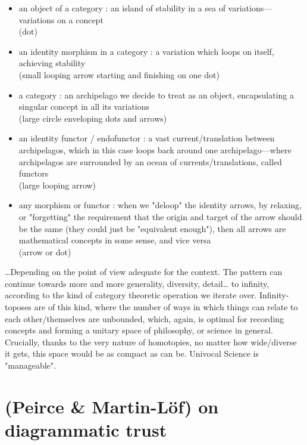\documentclass[11pt]{article}
\begin{document}
\begin{itemize}

\item an object of a category : an island of stability in a sea of variations---variations on
a concept\\ (dot)

\item an identity morphism in a category : a variation which loops on itself, achieving
stability\\ (small looping arrow starting and
finishing on one dot)

\item a category : an archipelago we decide to treat as an object, encapsulating a singular
concept in all its variations\\ (large circle
enveloping dots and arrows)

\item an identity functor / endofunctor : a vast current/translation between archipelagos,
which in this case loops back around one archipelago---where archipelagos are surrounded
by an ocean of currents/translations, called
functors\\ (large looping arrow)

\item any morphism or functor : when we "deloop" the identity arrows, by relaxing, or
"forgetting" the requirement that the origin and target of the arrow should be the same
(they could just be "equivalent enough"), then all arrows are mathematical concepts in
some sense, and vice versa\\ (arrow or dot)

\end{itemize}

\ldots{}Depending on the point of view adequate for the context. The pattern can
continue towards more and more generality, diversity, detail\ldots{} to infinity,
according to the kind of category theoretic operation we iterate over. Infinity-toposes
are of this kind, where the number of ways in which things can relate to each
other/themselves are unbounded, which, again, is optimal for recording concepts and
forming a unitary space of philosophy, or science in general. Crucially, thanks to the
very nature of homotopies, no matter how wide/diverse it gets, this space would be as
compact as can be. Univocal Science is "manageable".

\section*{(Peirce \& Martin-Löf) on diagrammatic trust}
\end{document}
